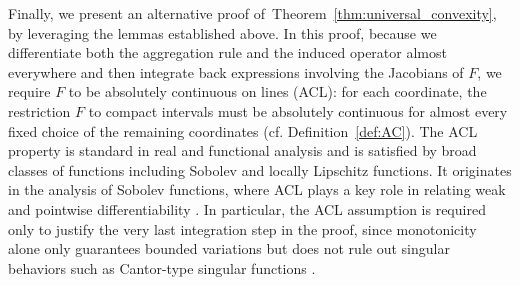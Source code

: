 \documentclass[twoside,11pt]{article}
\let\todo\relax%
\newcommand{\comm}[3][inline]{\todo[#1, size=\tiny]{#2: #3}}
\newcommand{\tbtodo}[2][inline]{\comm[color=orange,#1]{TB}{#2}}
\begin{document}
Finally, we present an alternative proof of~Theorem~\ref{thm:universal_convexity}, by leveraging the lemmas established above.
In this proof, because we differentiate both the aggregation rule and the induced operator almost everywhere and then integrate back expressions involving the Jacobians of $F$, we require $F$ to be absolutely continuous on lines (ACL): for each coordinate, the restriction $F$ to compact intervals must be absolutely continuous for almost every fixed choice of the remaining coordinates (cf. Definition~\ref{def:AC}).
The ACL property is standard in real and functional analysis and is satisfied by broad classes of functions including Sobolev and locally Lipschitz functions. 
It originates in the analysis of Sobolev functions, where ACL plays a key role in relating weak and pointwise differentiability \citep[cf.][Section 11.3]{leoni2017first}.
In particular, the ACL assumption is required only to justify the very last integration step in the proof, since monotonicity alone only guarantees bounded variations but does not rule out singular behaviors such as Cantor-type singular functions \citep[cf.][Paragraph 5.6]{albamb96}.
\end{document}
